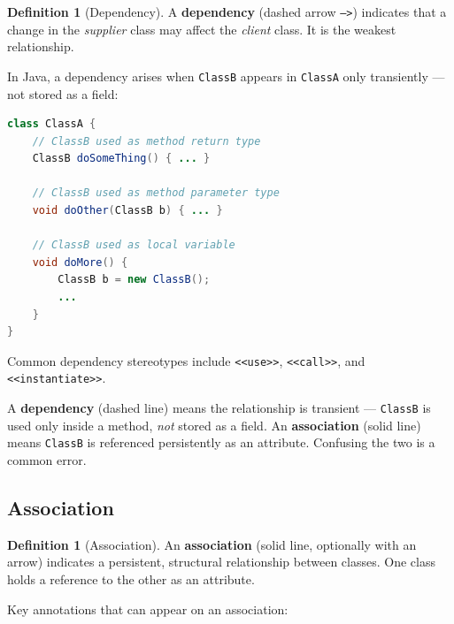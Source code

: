 \documentclass[11pt, a4paper, notitlepage]{report}
\theoremstyle{definition}
\newtheorem{definition}[theorem]{Definition}
\theoremstyle{remark}
\theoremstyle{definition}
\begin{document}
\begin{definition}[Dependency]
\label{def:ch6-dependency}
A \textbf{dependency} (dashed arrow \texttt{---{}>}) indicates that a change
in the \emph{supplier} class may affect the \emph{client} class.  It is the
weakest relationship.
\end{definition}

In Java, a dependency arises when \texttt{ClassB} appears in \texttt{ClassA}
only transiently --- not stored as a field:

\begin{lstlisting}[language=Java,caption={Dependency in Java}]
class ClassA {
    // ClassB used as method return type
    ClassB doSomeThing() { ... }

    // ClassB used as method parameter type
    void doOther(ClassB b) { ... }

    // ClassB used as local variable
    void doMore() {
        ClassB b = new ClassB();
        ...
    }
}
\end{lstlisting}

Common dependency stereotypes include \texttt{<<use>>}, \texttt{<<call>>},
and \texttt{<<instantiate>>}.

\begin{warning}[title={Warning: Dependency vs.\ Association}]
  A \textbf{dependency} (dashed line) means the relationship is transient ---
  \texttt{ClassB} is used only inside a method, \emph{not} stored as a field.
  An \textbf{association} (solid line) means \texttt{ClassB} is referenced
  persistently as an attribute.  Confusing the two is a common error.
\end{warning}

\subsection{Association}
\label{subsec:ch6-association}

\begin{definition}[Association]
\label{def:ch6-association}
An \textbf{association} (solid line, optionally with an arrow) indicates a
persistent, structural relationship between classes.  One class holds a
reference to the other as an attribute.
\end{definition}

Key annotations that can appear on an association:
\end{document}
